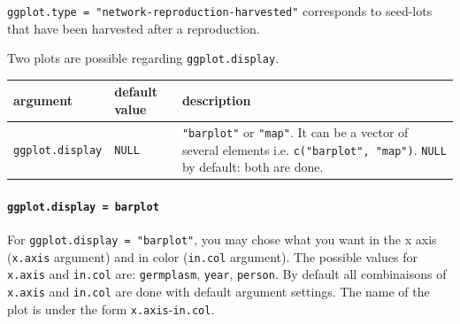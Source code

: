 \documentclass{article}\usepackage[]{graphicx}\usepackage[]{color}
\begin{document}
\texttt{ggplot.type = "network-reproduction-harvested"} corresponds to seed-lots that have been harvested after a reproduction.


Two plots are possible regarding \texttt{ggplot.display}.

\begin{center}
\begin{tabular}{ p{} p{} p{} }
\hline
argument & default value & description \\
\hline
\texttt{ggplot.display} & \texttt{NULL} & \texttt{"barplot"} or  \texttt{"map"}.
It can be a vector of several elements i.e. \texttt{c("barplot", "map")}. 
\texttt{NULL} by default: both are done. \\
\hline
\end{tabular}
\end{center}


\paragraph{\texttt{ggplot.display = barplot}}

For \texttt{ggplot.display = "barplot"}, you may chose what you want in the x axis (\texttt{x.axis} argument) and in color (\texttt{in.col} argument).
The possible values for \texttt{x.axis} and \texttt{in.col} are: \texttt{germplasm}, \texttt{year}, \texttt{person}.
By default all combinaisons of \texttt{x.axis} and \texttt{in.col} are done with default argument settings.
The name of the plot is under the form \texttt{x.axis}-\texttt{in.col}.
\end{document}
